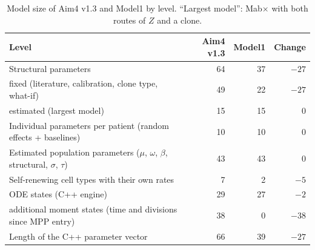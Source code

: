 \begin{table}[!htbp]
\centering
\small
\setlength{\tabcolsep}{3.5pt}
\caption{Model size of Aim4 v1.3 and Model1 by level. ``Largest model'': Mab$\times$ with both routes of $Z$ and a clone.}
\label{tab:levels}
\begin{tabular}{>{\raggedright\arraybackslash}p{9cm}rrr}
\toprule
Level & Aim4 v1.3 & Model1 & Change \\
\midrule
Structural parameters & 64 & 37 & $-27$ \\
\quad fixed (literature, calibration, clone type, what-if) & 49 & 22 & $-27$ \\
\quad estimated (largest model) & 15 & 15 & 0 \\
Individual parameters per patient (random effects + baselines) & 10 & 10 & 0 \\
Estimated population parameters ($\mu$, $\omega$, $\beta$, structural, $\sigma$, $\tau$) & 43 & 43 & 0 \\
Self-renewing cell types with their own rates & 7 & 2 & $-5$ \\
ODE states (C++ engine) & 29 & 27 & $-2$ \\
\quad additional moment states (time and divisions since MPP entry) & 38 & 0 & $-38$ \\
Length of the C++ parameter vector & 66 & 39 & $-27$ \\
\bottomrule
\end{tabular}
\end{table}
